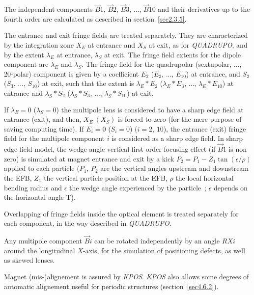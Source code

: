 \noindent The independent components $ \vec  B1$, $\vec  B2$, $\vec  B3$, ..., 
$ \vec  B10 $  and their derivatives up to the fourth order are calculated as described in 
 section~\ref{sec2.3.5}.  

\bigskip

\noindent The entrance and exit fringe fields are treated separately.  They
are characterized by the integration zone $ X_E $ at entrance and $ X_S $ at exit,
as for \textsl{QUADRUPO}, and by the extent $ \lambda_ E $ at entrance, 
$\lambda_ S $ at exit. The fringe field extents for the dipole component are $ \lambda_ E $ 
and $ \lambda_ S $. The fringe field for the quadrupolar 
(sextupolar,  ..., 20-polar) component is given by a coefficient $ E_2 $ 
 ($E_3$, ..., $E_{10}$)  at entrance, and 
$ S_2 $ ($ S_3$, ..., $S_{10}$)  at exit, such that the extent is $ \lambda_ E\ast E_2$
 ($\lambda_ E\ast E_3$, ..., $\lambda_ E\ast E_{10}$)  at 
entrance and $ \lambda_ S\ast S_2 $  ($\lambda_ S\ast S_3$, ..., $\lambda_ S\ast S_{10}$)  
at exit. 
\bigskip

\noindent If $ \lambda_ E=0 $  ($\lambda_ S=0$)  the multipole lens is
considered to have a sharp edge field at entrance (exit), and then, $ X_E \ (X_S) $ is forced to zero 
(for the mere purpose of saving computing time).  If $ E_i=0 $  ($S_i=0$) ($i=2,\, 10$), the entrance (exit) fringe field for 
 the multipole component $ i $ is considered as a sharp edge field.  
In sharp edge field model, the wedge angle vertical first order focusing effect (if $\vec  B1$ is non zero) is simulated at magnet entrance and exit  by a kick $P_2 = P_1 - Z_1 \tan (\epsilon / \rho)$ applied to each particle ($P_1$, $P_2$ are the vertical angles upstream and downstream the EFB, $Z_1$ the vertical particle position at the EFB, $\rho$ the local horizontal bending radius and $\epsilon$ the wedge angle experienced by the particle~; $\epsilon$ depends on the horizontal angle T). 

\bigskip

\noindent Overlapping of fringe fields inside the optical element  is treated separately
for each component, in the way described in \textsl{QUADRUPO}.  
\bigskip

\noindent Any multipole component $ \vec  Bi $ can be rotated independently
by an angle $ RXi $ around the longitudinal $ X$-axis, for the simulation of positioning defects,
as well as skewed lenses. 

\bigskip

\noindent Magnet (mis-)alignement is assured by \textsl{KPOS}. 
\textsl{KPOS} also  allows some degrees of automatic alignement useful for periodic structures (section~\ref{sec4.6.2}).



